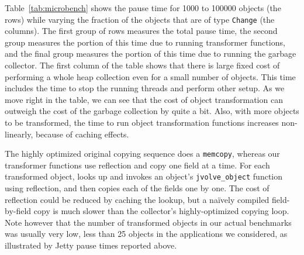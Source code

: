 Table~\ref{tab:microbench} shows the \DSU{} pause time for 1000 to 100000
objects (the rows) while varying the fraction of the objects that are of
type \texttt{Change} (the columns).  The first group of rows measures the
total pause time, the second group measures the portion of this time due to
running transformer functions, and the final group measures the portion of
this time due to running the garbage collector.  The first column of the
table shows that there is large fixed cost of performing a whole heap
collection even for a small number of objects.  This time includes the time
to stop the running threads and perform other setup.  As we move right in
the table, we can see that the cost of object transformation can outweigh
the cost of the garbage collection by quite a bit. Also, with more objects
to be transformed, the time to run object transformation functions
increases non-linearly, because of caching effects.

The highly optimized original copying sequence does a \texttt{memcopy}, whereas
our transformer functions use reflection and copy one field at a time.
For each transformed object, \DSU{} looks up and invokes an object's
\texttt{jvolve\_object} function using reflection, and then copies
each of the fields one by one.  The cost of reflection could be
reduced by caching the lookup, but a na\"ively compiled field-by-field
copy is much slower than the collector's highly-optimized copying loop.
Note however that the number of transformed objects in our actual
benchmarks was usually very low, less than 25 objects in the
applications we considered, as illustrated by Jetty pause times reported
above.

